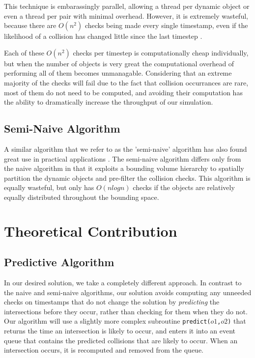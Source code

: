\documentclass[conference]{IEEEtran}
\begin{document}
This technique is embarassingly parallel, allowing a thread per dynamic object or even a thread per pair with minimal overhead.  However, it is extremely
wasteful, because there are $O(n^2)$ checks being made every single timestamp, even if the likelihood of a collision has changed little since the last timestep \cite{Seningood}.  

Each of these $O(n^2)$ checks per timestep is computationally cheap individually, but when the number of objects is very great the computational overhead of performing all of them becomes
unmanagable. Considering that an extreme majority of the checks will fail due to the fact that collision occurrances are rare, most of them do not need to be computed, and avoiding their computation has the ability to dramatically increase the 
throughput of our simulation.

\subsection{Semi-Naive Algorithm}

A similar algorithm that we refer to as the 'semi-naive' algorithm has also found great use in practical applications \cite{Bittner02hierarchicaltechniques}.  The semi-naive algorithm differs only from the naive algorithm in that it exploits a bounding volume hierarchy to spatially partition the dynamic objects and pre-filter the collision checks.  This algorithm is equally wasteful, but only has $O(n log n)$ checks if the objects are relatively equally distributed throughout the bounding space.

\section{Theoretical Contribution}
\label{sec:theocont}
\subsection{Predictive Algorithm}

In our desired solution, we take a completely different approach.  In contrast to the naive and semi-naive algorithms, our solution avoids computing any unneeded checks on timestamps that do not change the solution by \textit{predicting} the intersections before they occur, rather than checking for them when they do not.  Our algorithm will use a slightly more complex subroutine \texttt{predict($o1$,$o2$)} that returns the time an intersection is likely to occur, and enters it into an event queue that contains the predicted collisions that are likely to occur.  When an intersection occurs, it is recomputed and removed from the queue.
\end{document}
